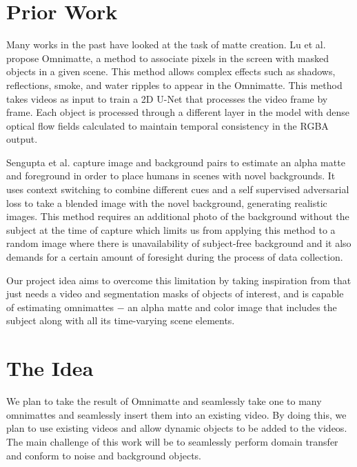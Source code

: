 \documentclass{article}
\begin{document}
\section{Prior Work}
Many works in the past have looked at the task of matte creation. Lu et al.\cite{lu2021} propose Omnimatte, a method to associate pixels in the screen with masked objects in a given scene. This method allows complex effects such as shadows, reflections, smoke, and water ripples to appear in the Omnimatte. This method takes videos as input to train a 2D U-Net that processes the video frame by frame. Each object is processed through a different layer in the model with dense optical flow fields calculated to maintain temporal consistency in the RGBA output. 

Sengupta et al.\cite{BMSengupta20} capture image and background pairs to estimate an alpha matte and foreground in order to place humans in scenes with novel backgrounds. It uses context switching to combine different cues and a self supervised adversarial loss to take a blended image with the novel background, generating realistic images. This method requires an additional photo of the background without the subject at the time of capture which limits us from applying this method to a random image where there is unavailability of subject-free background and it also demands for a certain amount of foresight during the process of data collection. 

Our project idea aims to overcome this limitation\cite{BMSengupta20} by taking inspiration from\cite{lu2021} that just needs a video and segmentation masks of objects of interest, and is capable of estimating omnimattes $-$ an alpha matte and color image that includes the subject along with all its time-varying scene elements. 


\section{The Idea}
We plan to take the result of Omnimatte and seamlessly take one to many omnimattes and seamlessly insert them into an existing video. By doing this, we plan to use existing videos and allow dynamic objects to be added to the videos. The main challenge of this work will be to seamlessly perform domain transfer and conform to noise and background objects.

\end{document}
